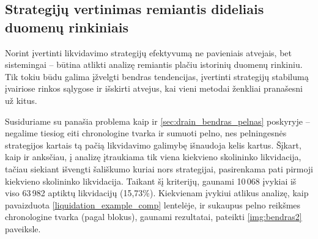 \documentclass[]{VUMIFTemplateClass}
\begin{document}
\subsection{Strategijų vertinimas remiantis dideliais duomenų rinkiniais}
\label{sec:lyginimas_daug}

Norint įvertinti likvidavimo strategijų efektyvumą ne pavieniais atvejais, bet sistemingai – būtina atlikti analizę remiantis plačiu istorinių duomenų rinkiniu. Tik tokiu būdu galima įžvelgti bendras tendencijas, įvertinti strategijų stabilumą įvairiose rinkos sąlygose ir išskirti atvejus, kai vieni metodai ženkliai pranašesni už kitus.

Susiduriame su panašia problema kaip ir \ref{sec:drain_bendras_pelnas} poskyryje – negalime tiesiog eiti chronologine tvarka ir sumuoti pelno, nes pelningesnės strategijos kartais tą pačią likvidavimo galimybę išnaudoja kelis kartus. Šįkart, kaip ir anksčiau, į analizę įtraukiama tik viena kiekvieno skolininko likvidacija, tačiau siekiant išvengti šališkumo kuriai nors strategijai, pasirenkama pati pirmoji kiekvieno skolininko likvidacija. Taikant šį kriterijų, gaunami 10\,068 įvykiai iš viso 63\,982 aptiktų likvidacijų (15,73\%). Kiekvienam įvykiui atlikus analizę, kaip pavaizduota \ref{liquidation_example_comp} lentelėje, ir sukaupus pelno reikšmes chronologine tvarka (pagal blokus), gaunami rezultatai, pateikti \ref{img:bendras2} paveiksle.
\end{document}
